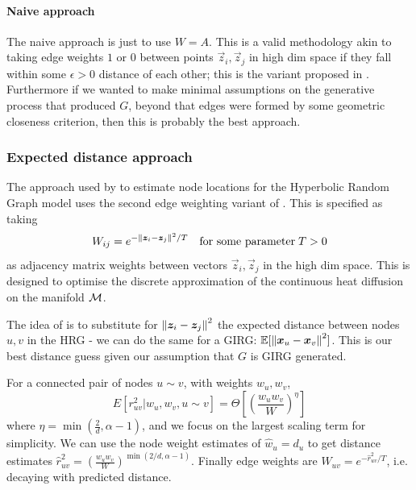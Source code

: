 \paragraph{Naive approach}
The naive approach is just to use $W = A$. This is a valid methodology akin to taking edge weights $1$ or $0$ between points $\vec{z}_i, \vec{z}_j$ in high dim space if they fall within some $\epsilon > 0$ distance of each other; this is the  variant proposed in \cite{belkin2001laplacian}. Furthermore if we wanted to make minimal assumptions on the generative process that produced $G$, beyond that edges were formed by some geometric closeness criterion, then this is probably the best approach.

\subsubsection{Expected distance approach}
The approach used by \cite{garcia2019mercator} to estimate node locations for the Hyperbolic Random Graph model uses the second  edge weighting variant of \cite{belkin2001laplacian}. This is specified as taking
\begin{equation}
  W_{ij} = e^{-\left\lVert \bm{z}_i - \bm{z}_j\right\rVert^2 / T} \quad \text{for some parameter}\; T > 0
\end{equation}
as adjacency matrix weights between vectors $\vec{z}_i, \vec{z}_j$ in the high dim space. This is designed to optimise the discrete approximation of the continuous heat diffusion on the manifold $\mathcal{M}$.

The idea of \cite{garcia2019mercator} is to substitute for $\left\lVert \bm{z}_i - \bm{z}_j\right\rVert^2$ the expected distance between nodes $u, v$ in the HRG - we can do the same for a GIRG: $\mathbb{E}[\left\lVert \bm{x}_u - \bm{x}_v\right\rVert^2]$. This is our best distance guess given our assumption that $G$ is GIRG generated.

For a connected pair of nodes $u \sim v$, with weights $w_u, w_v$,
\begin{equation}
  E[r_{uv}^2 | w_u, w_v, u \sim v] = \Theta \left [ \left ( \frac{w_u w_v}{W} \right )^\eta \right ]
\end{equation}
where $\eta = \min (\frac{2}{d}, \alpha - 1)$, and we focus on the largest scaling term for simplicity.
We can use the node weight estimates of $\hat{w}_u = d_u$ to get distance estimates $\hat{r}_{uv}^2 = \left ( \frac{w_u w_v}{W} \right )^{\min(2/d, \alpha - 1)}$. Finally edge weights are $W_{uv} = e^{-\hat{r}_{uv}^2 / T}$, i.e. decaying with predicted distance.

